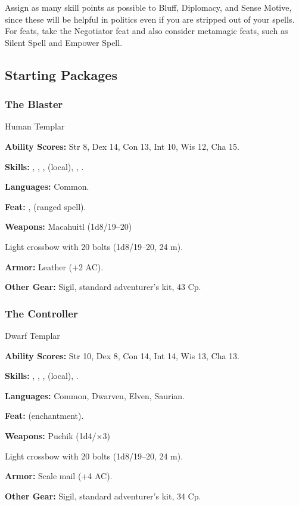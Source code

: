 Assign as many skill points as possible to Bluff, Diplomacy, and Sense Motive, since these will be helpful in politics even if you are stripped out of your spells. For feats, take the Negotiator feat and also consider metamagic feats, such as Silent Spell and Empower Spell.

\subsection{Starting Packages}
\subsubsection{The Blaster}
Human Templar

\textbf{Ability Scores:} Str 8, Dex 14, Con 13, Int 10, Wis 12, Cha 15.

\textbf{Skills:} , , ,  (local), , .

\textbf{Languages:} Common.

\textbf{Feat:} ,  (ranged spell).

\textbf{Weapons:} Macahuitl (1d8/19--20)

Light crossbow with 20 bolts (1d8/19--20, 24 m).

\textbf{Armor:} Leather (+2 AC).

\textbf{Other Gear:} Sigil, standard adventurer's kit, 43 Cp.

\subsubsection{The Controller}
Dwarf Templar

\textbf{Ability Scores:} Str 10, Dex 8, Con 14, Int 14, Wis 13, Cha 13.

\textbf{Skills:} , , ,  (local), .

\textbf{Languages:} Common, Dwarven, Elven, Saurian.

\textbf{Feat:}  (enchantment).

\textbf{Weapons:} Puchik (1d4/$\times$3)

Light crossbow with 20 bolts (1d8/19--20, 24 m).

\textbf{Armor:} Scale mail (+4 AC).

\textbf{Other Gear:} Sigil, standard adventurer's kit, 34 Cp.

